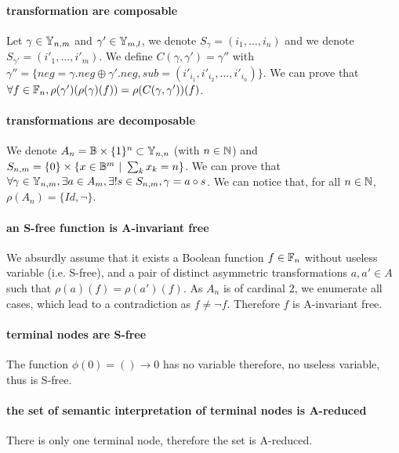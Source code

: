 \documentclass[a4paper,10pt]{article}
\begin{document}
\paragraph{transformation are composable\\}
Let $\gamma\in\mathbb{Y}_{n, m}$ and $\gamma'\in\mathbb{Y}_{m, l}$, we denote $S_{\gamma} = (i_1, \dots, i_n)$ and we denote $S_{\gamma'} = (i'_1, \dots, i'_m)$.
We define $C(\gamma, \gamma') = \gamma''$ with $\gamma'' = \{neg = \gamma.neg \oplus \gamma'.neg, sub = (i'_{i_1}, i'_{i_2}, \dots, i'_{i_n})\}$.
We can prove that $\forall f\in\mathbb{F}_n, \rho(\gamma')(\rho(\gamma)(f)) = \rho(C(\gamma, \gamma'))(f)$.

\paragraph{transformations are decomposable\\}
We denote $A_n = \mathbb{B}\times\{1\}^n \subset\mathbb{Y}_{n, n}$ (with $n\in\mathbb{N}$) and $S_{n, m} = \{0\}\times\{x\in\mathbb{B}^m~|~\sum_k x_k = n\}$.
We can prove that $\forall \gamma \in \mathbb{Y}_{n, m}, \exists a \in A_m, \exists! s \in S_{n, m},  \gamma = a \circ s$.
We can notice that, for all $n\in\mathbb{N}$, $\rho(A_n) = \{Id, \lnot\}$.

\paragraph{an S-free function is A-invariant free\\}
We absurdly assume that it exists a Boolean function $f\in\mathbb{F}_n$ without useless variable (i.e. S-free), and a pair of distinct asymmetric transformations $a, a'\in A$ such that $\rho(a)(f) = \rho(a')(f)$.
As $A_n$ is of cardinal 2, we enumerate all cases, which lead to a contradiction as $f \neq \lnot f$.
Therefore $f$ is A-invariant free.

\paragraph{terminal nodes are S-free\\}
The function $\phi(0) = () \longrightarrow 0$ has no variable therefore, no useless variable, thus is S-free.

\paragraph{the set of semantic interpretation of terminal nodes is A-reduced\\}
There is only one terminal node, therefore the set is A-reduced.
\end{document}

